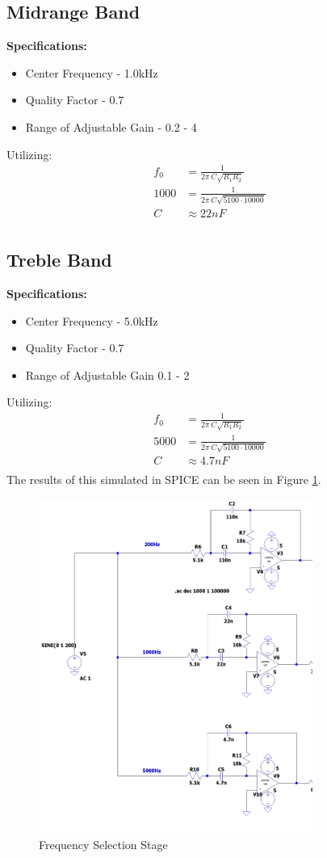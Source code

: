 \documentclass[12pt]{article}
\begin{document}
\subsection{Midrange Band}
\noindent \textbf{Specifications:}
\begin{itemize}
	\item Center Frequency - 1.0kHz
	\item Quality Factor - 0.7
	\item Range of Adjustable Gain - 0.2 - 4
\end{itemize}
Utilizing:
\begin{align*}
	f_0 & = \frac{1}{2\pi\,C\sqrt{R_1R_2}}     \\
	1000 & = \frac{1}{2\pi\,C\sqrt{5100\cdot10000}}\\
	C & \approx 22nF\\
\end{align*}
\subsection{Treble Band}
\noindent \textbf{Specifications:}
\begin{itemize}
	\item Center Frequency - 5.0kHz
	\item Quality Factor - 0.7
	\item Range of Adjustable Gain 0.1 - 2
\end{itemize}
Utilizing:
\begin{align*}
	f_0 & = \frac{1}{2\pi\,C\sqrt{R_1R_2}}     \\
	5000 & = \frac{1}{2\pi\,C\sqrt{5100\cdot10000}}\\
	C & \approx 4.7nF\\
\end{align*}
The results of this simulated in SPICE can be seen  in Figure \ref{fig:mfbstage}.
\begin{figure}[H]
	\centering
	\includegraphics[width=0.8\textwidth]{mfbstage}
	\caption{Frequency Selection Stage}
	\label{fig:mfbstage}
\end{figure}
\end{document}
